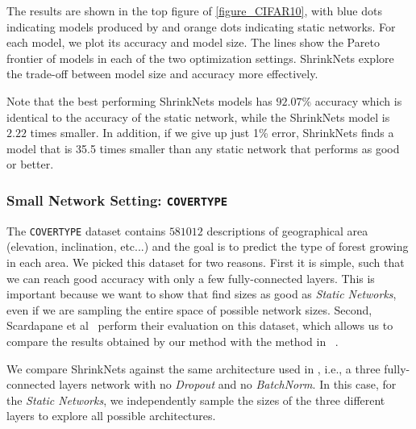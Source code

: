 The results are shown in the top figure of \cref{figure_CIFAR10}, with blue dots
indicating models produced by \shrink and orange dots indicating static networks. 
For each
model, we plot its accuracy and model size. The lines show the Pareto frontier
of models in each of the two optimization settings. ShrinkNets explore the
trade-off between model size and accuracy more effectively. 

Note that the best performing ShrinkNets models has $92.07\%$ accuracy which
is identical to the accuracy of the static network, while the ShrinkNets model
is $2.22$ times smaller. In addition, if we give up just 1\% error, ShrinkNets
finds a model that is 35.5 times smaller than any static network that performs
as good or better.

\subsubsection{Small Network Setting: \texttt{COVERTYPE}}

The \texttt{COVERTYPE} \cite{Blackard:1998:CNN:928509} dataset contains $581012$
descriptions of geographical area (elevation, inclination, etc...) and the goal
is to predict the type of forest growing in each area. We picked this dataset
for two reasons. First it is simple, such that we can reach good accuracy with
only a few fully-connected layers. This is important because we want to show
that \shrink find sizes as good as \textit{Static Networks}, even if
we are sampling the entire space of possible network sizes. Second, Scardapane
et al~\cite{Scardapane2017} perform their evaluation on this dataset, which
allows us to compare the results obtained by our method with the method in
~\cite{Scardapane2017}.

We compare ShrinkNets against the same architecture
used in \cite{Scardapane2017}, i.e., a three fully-connected layers network with no
\textit{Dropout} \cite{Srivastava2014} and no \textit{BatchNorm}. 
In this case, for the \textit{Static Networks}, we independently sample the
sizes of the three different layers to explore all possible architectures.

